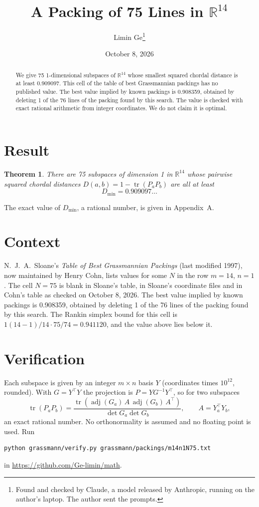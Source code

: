 \documentclass[11pt,a4paper]{article}
\title{A Packing of 75 Lines in $\mathbb{R}^{14}$}
\author{Limin Ge\thanks{Found and checked by Claude, a model released by Anthropic, running on the author's laptop. The author sent the prompts.}}
\date{October 8, 2026}
\newtheorem*{theorem}{Theorem}
\begin{document}
\maketitle
\begin{abstract}
We give 75 1-dimensional subspaces of $\mathbb{R}^{14}$ whose smallest squared chordal distance is at least 0.909097. This cell of the table of best Grassmannian packings has no published value. The best value implied by known packings is 0.908359, obtained by deleting 1 of the 76 lines of the packing found by this search. The value is checked with exact rational arithmetic from integer coordinates. We do not claim it is optimal.
\end{abstract}

\section{Result}
\begin{theorem}
There are 75 subspaces of dimension 1 in $\mathbb{R}^{14}$ whose pairwise squared chordal distances $D(a,b) = 1 - \operatorname{tr}(P_aP_b)$ are all at least
\[ D_{\min} = 0.909097\ldots \]
\end{theorem}
The exact value of $D_{\min}$, a rational number, is given in Appendix~A.


\section{Context}
N.~J.~A.~Sloane's \emph{Table of Best Grassmannian Packings} (last modified 1997), now maintained by Henry Cohn, lists values for some $N$ in the row $m=14$, $n=1$. The cell $N=75$ is blank in Sloane's table, in Sloane's coordinate files and in Cohn's table as checked on October 8, 2026. The best value implied by known packings is 0.908359, obtained by deleting 1 of the 76 lines of the packing found by this search. The Rankin simplex bound for this cell is $1(14-1)/14\cdot 75/74 = 0.941120$, and the value above lies below it.


\section{Verification}
Each subspace is given by an integer $m\times n$ basis $Y$ (coordinates times $10^{12}$, rounded). With $G=Y^\top Y$ the projection is $P=YG^{-1}Y^\top$, so for two subspaces
\[ \operatorname{tr}(P_aP_b)=\frac{\operatorname{tr}(\operatorname{adj}(G_a)\,A\,\operatorname{adj}(G_b)\,A^\top)}{\det G_a\det G_b},\qquad A=Y_a^\top Y_b, \]
an exact rational number. No orthonormality is assumed and no floating point is used. Run
\begin{verbatim}
python grassmann/verify.py grassmann/packings/m14n1N75.txt
\end{verbatim}
in \url{https://github.com/Ge-limin/math}.
\end{document}
